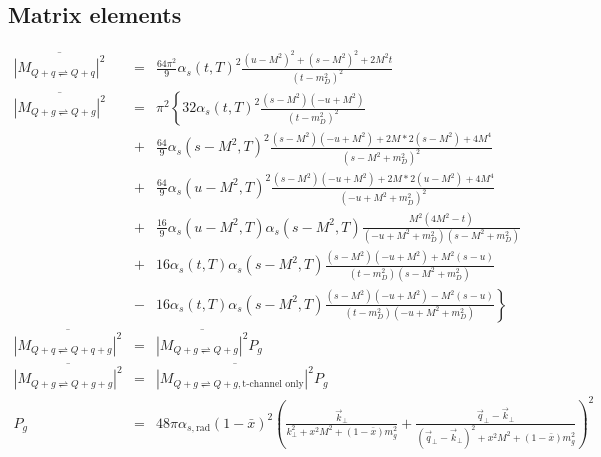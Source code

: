 \documentclass[aps, prc, reprint, amsmath, groupedaddress, nofootinbib]{revtex4-1}
\begin{document}
\begin{appendices}
\section{Matrix elements}
\label{appendix:matrix-element}
\begin{widetext}
\begin{eqnarray}
\overline{|M_{Q+q\rightleftharpoons Q+q}|^2} &=& \frac{64\pi^2}{9}\alpha_s(t, T)^2 \frac{(u-M^2)^2 + (s-M^2)^2 + 2 M^2 t}{(t-m_D^2)^2}\\
\overline{|M_{Q+g\rightleftharpoons Q+g}|^2} &=& \pi^2 \left\{
32\alpha_s(t,T)^2 \frac{(s-M^2)(-u+M^2)}{(t-m_D^2)^2} \right. \\ \nonumber
&+&\frac{64}{9}\alpha_s(s-M^2, T)^2 \frac{(s-M^2)(-u+M^2)+2M*2(s-M^2) + 4M^4}{(s-M^2+m_D^2)^2} \\ \nonumber
&+&\frac{64}{9}\alpha_s(u-M^2, T)^2 \frac{(s-M^2)(-u+M^2)+2M*2(u-M^2) + 4M^4}{(-u+M^2+m_D^2)^2} \\ \nonumber
&+&\frac{16}{9}\alpha_s(u-M^2, T)\alpha_s(s-M^2, T) \frac{M^2(4M^2 - t)}{(-u+M^2+m_D^2)(s-M^2+m_D^2)} \\ \nonumber
&+& 16 \alpha_s(t, T)\alpha_s(s-M^2, T) \frac{(s-M^2)(-u+M^2)+M^2(s-u)}{(t-m_D^2)(s-M^2+m_D^2)} \\ \nonumber
&-& \left. 16 \alpha_s(t, T)\alpha_s(s-M^2, T) \frac{(s-M^2)(-u+M^2)-M^2(s-u)}{(t-m_D^2)(-u+M^2+m_D^2)}\right\} \\
\overline{|M_{Q+q\rightleftharpoons Q+q+g}|^2} &=& \overline{|M_{Q+g\rightleftharpoons Q+g}|^2} P_g \\
\overline{|M_{Q+g\rightleftharpoons Q+g+g}|^2} &=& \overline{|M_{Q+g\rightleftharpoons Q+g, \textrm{t-channel only}}|^2} P_g \\
P_g &=& 48 \pi \alpha_{s, \textrm{rad}} (1-\bar{x})^2 \left(\frac{\vec{k}_\perp}{k_\perp^2 + x^2 M^2 + (1-\bar{x})m_g^2} 
+ \frac{\vec{q}_\perp - \vec{k}_\perp}{(\vec{q}_\perp-\vec{k}_\perp)^2 + x^2 M^2 + (1-\bar{x})m_g^2}
\right)^2 
\end{eqnarray}
\end{widetext}


\end{appendices}
\end{document}
